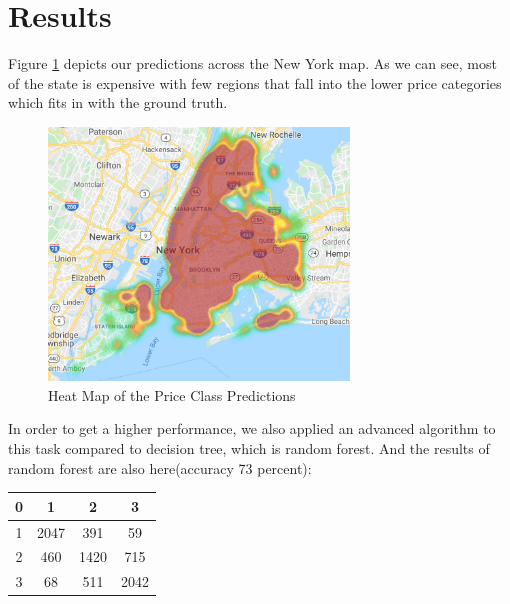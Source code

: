 \documentclass{sig-alternate}
\begin{document}
	\section{Results}
	Figure \ref{nyheatmap} depicts our predictions across the New York map. As we can see, most of the state is expensive with few regions that fall into the lower price categories which fits in with the ground truth.\\ 
	\begin{figure}[ht]
		\includegraphics[width=8cm]{heatmap.png}
		\caption{Heat Map of the Price Class Predictions}
		\label{nyheatmap}
		\centering
	\end{figure}
	
	In order to get a higher performance, we also applied an advanced algorithm to this task compared to decision tree, which is random forest.
	And the results of random forest are also here(accuracy 73 percent):


		\begin{tabular}{c|c|c|c}
		\hline
		 0 &1 & 2 & 3 \\
		\hline
		1  & 2047 & 391 &59 \\
		2  & 460 & 1420&715 \\
		3   &68  & 511& 2042\\
		\hline
		\end{tabular}
\end{document}
